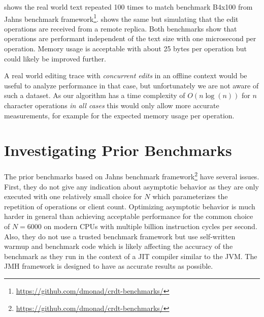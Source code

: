  shows the real world text repeated 100 times to match benchmark B4x100 from Jahns benchmark framework\footnote{\url{https://github.com/dmonad/crdt-benchmarks/}}.  shows the same but simulating that the edit operations are received from a remote replica. Both benchmarks show that operations are performant independent of the text size with one microsecond per operation. Memory usage is acceptable with about 25 bytes per operation but could likely be improved further.

A real world editing trace with \textit{concurrent edits} in an offline context would be useful to analyze performance in that case, but unfortunately we are not aware of such a dataset. As our algorithm has a time complexity of $O(n\log(n))$ for $n$ character operations \textit{in all cases} this would only allow more accurate measurements, for example for the expected memory usage per operation.

\section{Investigating Prior Benchmarks}

The prior benchmarks based on Jahns benchmark framework\footnote{\url{https://github.com/dmonad/crdt-benchmarks/}} have several issues. First, they do not give any indication about asymptotic behavior as they are only executed with one relatively small choice for $N$ which parameterizes the repetition of operations or client count. Optimizing asymptotic behavior is much harder in general than achieving acceptable performance for the common choice of $N=6000$ on modern CPUs with multiple billion instruction cycles per second. Also, they do not use a trusted benchmark framework but use self-written warmup and benchmark code which is likely affecting the accuracy of the benchmark as they run in the context of a JIT compiler similar to the JVM. The JMH framework is designed to have as accurate results as possible.
